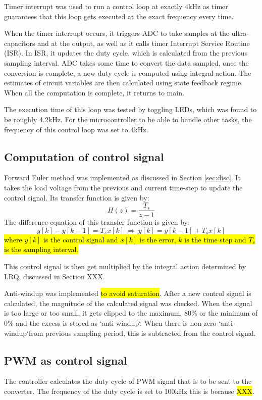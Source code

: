Timer interrupt was used to run a control loop at exactly 4kHz as timer guarantees that this loop gets executed at the exact frequency every time. 

When the timer interrupt occurs, it triggers ADC to take samples at the ultra-capacitors and at the output, as well as it calls timer Interrupt Service Routine (ISR). In ISR, it updates the duty cycle, which is calculated from the previous sampling interval. ADC takes some time to convert the data sampled, once the conversion is complete, a new duty cycle is computed using integral action. The estimates of circuit variables are then calculated using state feedback regime. When all the computation is complete, it returns to main. 

The execution time of this loop was tested by toggling LEDs, which was found to be roughly 4.2kHz. For the microcontroller to be able to handle other tasks, the frequency of this control loop was set to 4kHz. 

\subsection{Computation of control signal}
Forward Euler method was implemented as discussed in Section \ref{sec:disc}. It takes the load voltage from the previous and current time-step to update the control signal. Its transfer function is given by:
\[
    H(z) = \frac{T_s}{z-1}
\]
The difference equation of this transfer function is given by:
\[
    y[k] - y[k-1] = T_s x[k] \: \Longrightarrow \: y[k] = y[k-1] + T_s x[k]
\]
\hl{where $y[k]$ is the control signal and $x[k]$ is the error, $k$ is the time step and $T_s$ is the sampling interval.}

This control signal is then get multiplied by the integral action determined by LRQ, discussed in Section XXX.

Anti-windup was implemented \hl{to avoid saturation}. After a new control signal is calculated, the magnitude of the calculated signal was checked. When the signal is too large or too small, it gets clipped to the maximum, 80\% or the minimum of 0\% and the excess is stored as \lq anti-windup\lq. When there is non-zero \lq anti-windup\lq from previous sampling period, this is subtracted from the control signal. 

\subsection{PWM as control signal}
The controller calculates the duty cycle of PWM signal that is to be sent to the converter. The frequency of the duty cycle is set to 100kHz this is because \hl{XXX}. 


